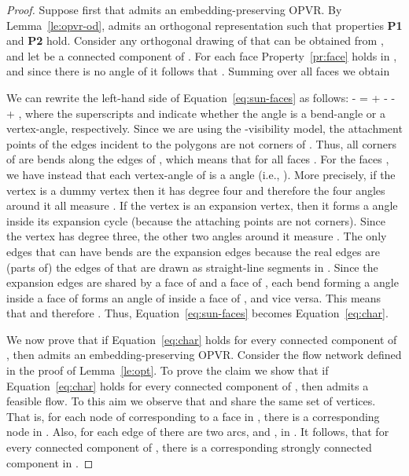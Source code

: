 \documentclass{article}
\newcommand{\opvr}{OPVR\xspace}
\begin{document}
\begin{proof}
Suppose first that  admits an embedding-preserving \opvr . By Lemma~\ref{le:opvr-od},  admits an orthogonal representation  such that properties {\bf P1} and {\bf P2} hold. Consider any orthogonal drawing  of  that can be obtained from , and let  be a connected component of . For each face  Property~\ref{pr:face} holds in , and since there is no angle of  it follows that . Summing over all faces we obtain



We can rewrite the left-hand side of Equation~\ref{eq:sun-faces} as follows: 
 -  =  +  -  -  + , where the superscripts  and  indicate whether the angle is a bend-angle or a vertex-angle, respectively. Since we are using the -visibility model, the attachment points of the edges incident to the polygons  are not corners of . Thus, all corners of  are bends along the edges of , which means that  for all faces . For the faces , we have instead that each vertex-angle of  is a  angle (i.e., ). More precisely, if the vertex is a dummy vertex then it has degree four and therefore the four angles around it all measure . If the vertex is an expansion vertex, then it forms a  angle inside its expansion cycle (because the attaching points are not corners). Since the vertex has degree three, the other two angles around it measure . The only edges that can have bends are the expansion edges because the real edges are (parts of) the edges of  that are drawn as straight-line segments in . Since the expansion edges are shared by a face of  and a face of , each bend forming a  angle inside a face of  forms an angle of  inside a face of , and vice versa. This means that
 and therefore . Thus, Equation~\ref{eq:sun-faces} becomes Equation~\ref{eq:char}.

We now prove that if Equation~\ref{eq:char} holds for every connected component  of , then  admits an embedding-preserving \opvr. Consider the flow network  defined in the proof of Lemma~\ref{le:opt}. To prove the claim we show that if  Equation~\ref{eq:char} holds for every connected component  of , then  admits a feasible flow. To this aim we observe that  and  share the same set of vertices. That is, for each node  of  corresponding to a face  in , there is a corresponding node  in . Also, for each edge  of  there are two arcs,  and , in . It follows, that for every connected component  of , there is a corresponding strongly connected component  in .


\end{proof}
\end{document}
